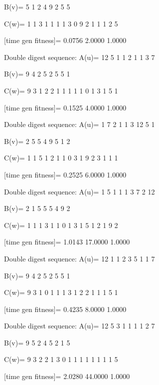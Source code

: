 B(v)=
     5     1     2     4     9     2     5     5

C(w)=
     1     1     3     1     1     1     1     3     0     9     2     1     1     1     2     5

[time gen fitness]=
    0.0756    2.0000    1.0000

Double digest sequence:
A(u)=
    12     5     1     1     2     1     1     3     7

B(v)=
     9     4     2     5     2     5     5     1

C(w)=
     9     3     1     2     2     1     1     1     1     1     0     1     3     1     5     1

[time gen fitness]=
    0.1525    4.0000    1.0000

Double digest sequence:
A(u)=
     1     7     2     1     1     3    12     5     1

B(v)=
     2     5     5     4     9     5     1     2

C(w)=
     1     1     5     1     2     1     1     0     3     1     9     2     3     1     1     1

[time gen fitness]=
    0.2525    6.0000    1.0000

Double digest sequence:
A(u)=
     1     5     1     1     1     3     7     2    12

B(v)=
     2     1     5     5     5     4     9     2

C(w)=
     1     1     1     3     1     1     0     1     3     1     5     1     2     1     9     2

[time gen fitness]=
    1.0143   17.0000    1.0000

Double digest sequence:
A(u)=
    12     1     1     2     3     5     1     1     7

B(v)=
     9     4     2     5     2     5     5     1

C(w)=
     9     3     1     0     1     1     1     3     1     2     2     1     1     1     5     1

[time gen fitness]=
    0.4235    8.0000    1.0000

Double digest sequence:
A(u)=
    12     5     3     1     1     1     1     2     7

B(v)=
     9     5     2     4     5     2     1     5

C(w)=
     9     3     2     2     1     3     0     1     1     1     1     1     1     1     1     5

[time gen fitness]=
    2.0280   44.0000    1.0000

